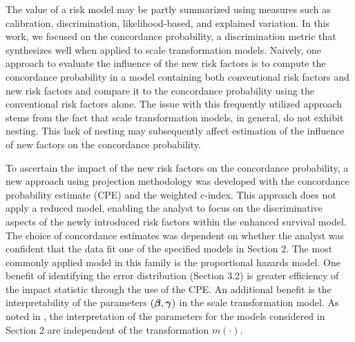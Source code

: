 \documentclass[12pt]{article}
\newcommand{\bmx}{\mbox{\boldmath $x$}}
\newcommand{\bg}{\mbox{\boldmath $\gamma$}}
\newcommand{\bb}{\mbox{\boldmath $\beta$}}
\begin{document}
The value of a risk model may be partly summarized using measures such as calibration, discrimination, likelihood-based, and explained variation. In this work, we focused on the concordance probability, a discrimination metric that synthesizes well when applied to scale transformation models. Naively, one approach to evaluate the influence of the new risk factors is to compute the concordance probability in a model containing both conventional risk factors and new risk factors and compare it to the concordance probability using the conventional risk factors alone. The issue with this frequently utilized approach stems from the fact that scale transformation models, in general, do not exhibit nesting. This lack of nesting may subsequently affect estimation of the influence of new factors on the concordance probability.

To ascertain the impact of the new risk factors on the concordance probability, a new approach using projection methodology was developed with the concordance probability estimate (CPE) and the weighted c-index. This approach does not apply a reduced model, enabling the analyst to focus on the discriminative aspects of the newly introduced risk factors within the enhanced survival model. The choice of concordance estimates was dependent on whether the analyst was confident that the data fit one of the specified models in Section 2. The most commonly applied model in this family is the proportional hazards model. One benefit of identifying the error distribution (Section 3.2) is greater efficiency of the impact statistic through the use of the CPE. An additional benefit is the interpretability of the parameters $(\bb, \bg)$ in the scale transformation model. As noted in \cite{Dabrowska1988}, the interpretation of the parameters for the models considered in Section 2 are independent of the transformation $m(\cdot)$. 
\end{document}
